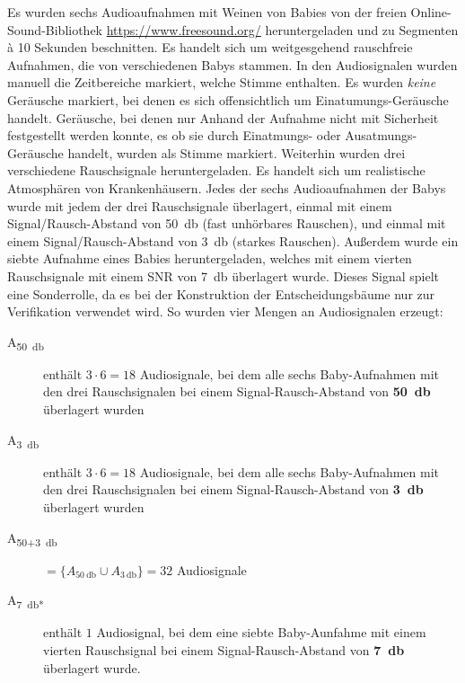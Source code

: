 Es wurden sechs Audioaufnahmen mit Weinen von Babies von der freien Online-Sound-Bibliothek \url{https://www.freesound.org/} heruntergeladen und zu Segmenten à 10 Sekunden beschnitten. Es handelt sich um weitgesgehend rauschfreie Aufnahmen, die von verschiedenen Babys stammen. In den Audiosignalen wurden manuell die Zeitbereiche markiert, welche Stimme enthalten. Es wurden \emph{keine} Geräusche markiert, bei denen es sich offensichtlich um Einatumungs-Geräusche handelt. Geräusche, bei denen nur Anhand der Aufnahme nicht mit Sicherheit festgestellt werden konnte, es ob sie durch Einatmungs- oder Ausatmungs-Geräusche handelt, wurden als Stimme markiert. Weiterhin wurden drei verschiedene Rauschsignale heruntergeladen. Es handelt sich um \glqq realistische\grqq{} Atmosphären von Krankenhäusern. Jedes der sechs Audioaufnahmen der Babys wurde mit jedem der drei Rauschsignale überlagert, einmal mit einem Signal/Rausch-Abstand von \SI{50}{\decibel} (\glqq fast unhörbares Rauschen\grqq), und einmal mit einem Signal/Rausch-Abstand von \SI{3}{\decibel} (\glqq starkes Rauschen\grqq). Außerdem wurde ein siebte Aufnahme eines Babies heruntergeladen, welches mit einem vierten Rauschsignale mit einem SNR von \SI{7}{\decibel} überlagert wurde. Dieses Signal spielt eine Sonderrolle, da es bei der Konstruktion der Entscheidungsbäume nur zur Verifikation verwendet wird. So wurden vier Mengen an Audiosignalen erzeugt:

\begin{description}
	\item[A\textsubscript{\SI{50}{\decibel}}] enthält $3 \cdot 6=18$ Audiosignale, bei dem alle sechs Baby-Aufnahmen mit den drei Rauschsignalen bei einem Signal-Rausch-Abstand von \textbf{\SI{50}{\decibel}} überlagert wurden
	
	\item[A\textsubscript{\SI{3}{\decibel}}] enthält $3 \cdot 6=18$ Audiosignale, bei dem alle sechs Baby-Aufnahmen mit den drei Rauschsignalen bei einem Signal-Rausch-Abstand von \textbf{\SI{3}{\decibel}} überlagert wurden
	
	\item[A\textsubscript{50+\SI{3}{\decibel}}] $ = \{ A_{\SI{50}{\decibel}} \cup  A_{\SI{3}{\decibel}}\} = 32$ Audiosignale
	
	\item[A\textsubscript{\SI{7}{\decibel}*}] enthält $1$ Audiosignal, bei dem eine siebte Baby-Aunfahme mit einem vierten Rauschsignal bei einem Signal-Rausch-Abstand von \textbf{\SI{7}{\decibel}} überlagert wurde.
	
\end{description}

